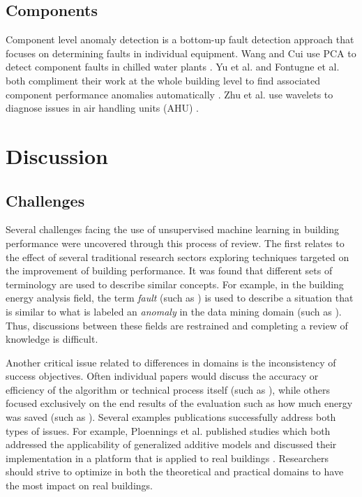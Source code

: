 \documentclass[preprint,12pt,3p]{elsarticle}
\begin{document}
\subsection{Components}
Component level anomaly detection is a bottom-up fault detection approach that focuses on determining faults in individual equipment. Wang and Cui use PCA to detect component faults in chilled water plants  \cite{wang_sensor-fault_2005}. Yu et al. and Fontugne et al. both compliment their work at the whole building level to find associated component performance anomalies automatically \cite{yu_novel_2012,fontugne_mining_2013}. Zhu et al. use wavelets to diagnose issues in air handling units (AHU) \cite{zhu_fault_2012}.


\section{Discussion}
\label{discussion}

\subsection{Challenges}
Several challenges facing the use of unsupervised machine learning in building performance were uncovered through this process of review. The first relates to the effect of several traditional research sectors exploring techniques targeted on the improvement of building performance. It was found that different sets of terminology are used to describe similar concepts. For example, in the building energy analysis field, the term \emph{fault} (such as \cite{zhu_fault_2012}) is used to describe a situation that is similar to what is labeled an \emph{anomaly} in the data mining domain (such as \cite{fontugne_mining_2013}). Thus, discussions between these fields are restrained and completing a review of knowledge is difficult.

Another critical issue related to differences in domains is the inconsistency of success objectives. Often individual papers would discuss the accuracy or efficiency of the algorithm or technical process itself (such as \cite{iglesias_analysis_2013}), while others focused exclusively on the end results of the evaluation such as how much energy was saved (such as \cite{seem_using_2006}). Several examples publications successfully address both types of issues. For example, Ploennings et al. published studies which both addressed the applicability of generalized additive models and discussed their implementation in a platform that is applied to real buildings \cite{ploennigs_exploiting_2013,ploennigs_e2-diagnoser:_2014}. Researchers should strive to optimize in both the theoretical and practical domains to have the most impact on real buildings.
\end{document}
